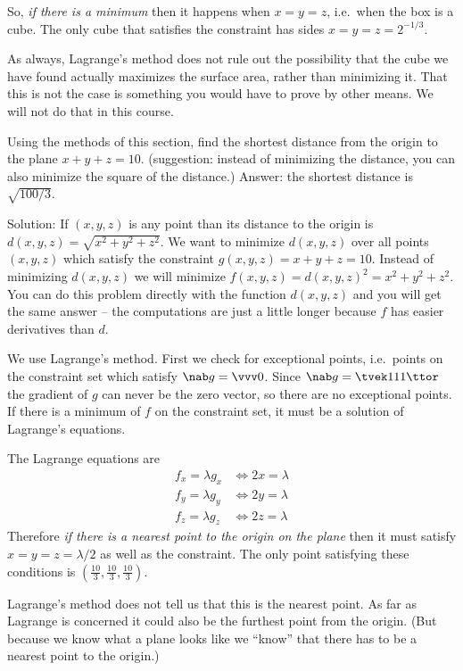 \begin{multicols}{2}
So, \emph{if there is a minimum} then it happens when $x=y=z$, i.e.\
when the box is a cube.  The only cube that satisfies the constraint
has sides $x=y=z=2^{-1/3}$.

As always, Lagrange's method does not rule out the possibility that
the cube we have found actually maximizes the surface area, rather
than minimizing it.  That this is not the case is something
you would have to prove by other means.  We will not do that in this
course.
\endanswer

\problem Using the methods of this section, find the shortest distance from  
the origin to the plane $x+y+z=10$.  (suggestion: instead of
minimizing the distance, you can also minimize the square of the
distance.)
\answer  Answer: the shortest distance is $\sqrt{100/3}$.  

Solution:  If $(x, y, z)$ is any point than its distance to the origin
is $d(x, y, z) = \sqrt{x^2+y^2+z^2}$.  We want to minimize $d(x, y,
z)$ over all points $(x, y, z)$ which satisfy the constraint
$g(x, y, z) = x+y+z=10$.  Instead of minimizing $d(x, y, z)$ we will
minimize $f(x, y, z) = d(x, y, z)^2 = x^2+y^2+z^2$.  You can do this
problem directly with the function $d(x,y,z)$ and you will get the
same answer -- the computations are just a little longer because
$f$ has easier derivatives than $d$.

We use Lagrange's method.  First we check for exceptional points,
i.e.\ points on the constraint set which satisfy $\nab g=\vvv0$.
Since $\nab g = \tvek1\\1\\1\ttor$ the gradient of $g$ can never be
the zero vector, so there are no exceptional points.  If there is a
minimum of $f$ on the constraint set, it must be a solution of
Lagrange's equations.

The Lagrange equations are 
\begin{align*}
  f_x=\lambda g_x &\iff 2x = \lambda\\
  f_y=\lambda g_y &\iff 2y=\lambda\\
  f_z=\lambda g_z &\iff 2z=\lambda
\end{align*}
Therefore \emph{if there is a nearest point to the origin on the
plane} then it must satisfy $x=y=z=\lambda/2$ as well as the
constraint.  The only point satisfying these conditions is
$(\tfrac{10}3,\tfrac{10}3,\tfrac{10}3)$.

Lagrange's method does not tell us that this is the nearest point. As
far as Lagrange is concerned it could also be the furthest point from
the origin.  (But because we know what a plane looks like we ``know''
that there has to be a nearest point to the origin.)



\end{multicols}
